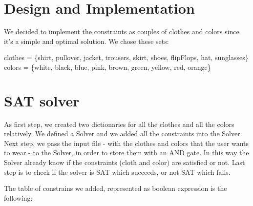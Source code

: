 \documentclass[12pt]{article}
\begin{document}
\section{Design and Implementation}
We decided to implement the constraints as couples of clothes and colors since it's a simple and optimal solution. We chose these sets:


\begin{center}
	clothes = \{shirt, pullover, jacket, trousers, skirt, shoes, flipFlops, hat, sunglasses\}\\
	colors = \{white, black, blue, pink, brown, green, yellow, red, orange\}
\end{center}


\section{SAT solver}

As first step, we created two dictionaries for all the clothes and all the colors relatively. We defined a Solver and we added all the constraints into the Solver. Next step, we pass the input file - with the clothes and colors that the user wants to wear - to the Solver, in order to store them with an AND gate. In this way the Solver already know if the constraints (cloth and color) are satisfied or not. Last step is to check if the solver is SAT which succeeds, or not SAT which fails.  

The table of constrains we added, represented as boolean expression is the following:
\end{document}

